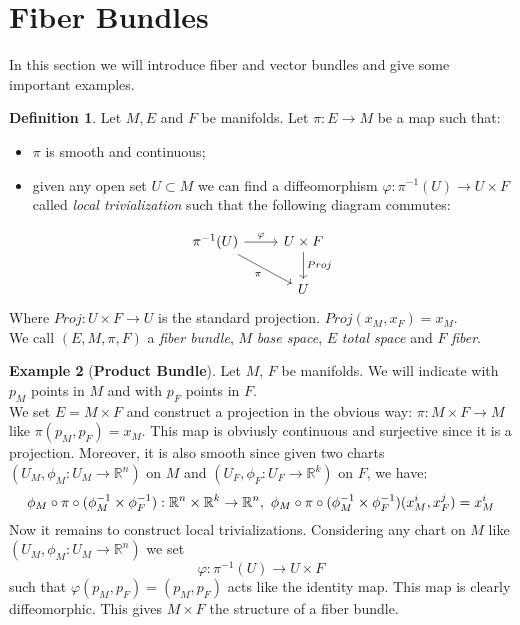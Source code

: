 \documentclass[12pt,a4paper]{report}
\theoremstyle{definition}
\newtheorem{Def}{Definition}[chapter]
\theoremstyle{Theorem}
\theoremstyle{definition}
\newtheorem{Ex}[Def]{Example}
\theoremstyle{definition}
\begin{document}
		\section{Fiber Bundles}
		In this section we will introduce fiber and vector bundles and give some important examples.
			\begin{Def}
				Let $M, E$ and $F$ be manifolds. Let $\pi: E\rightarrow M$ be a map such that:
				\begin{itemize}
					\item $\pi$ is smooth and continuous;
					\item given any open set $U\subset M$ we can find a diffeomorphism $\varphi: \pi^{-1}(U)\rightarrow U\times F$ called \textit{local trivialization} such that the following diagram commutes:
				\end{itemize}
						\[
				\begin{tikzcd}
					\pi^{-1}(U) \arrow{r}{\varphi} \arrow[swap]{dr}{\pi} & U\times F \arrow{d}{Proj}\\
					& U 
				\end{tikzcd}
				\]
				Where $Proj: U\times F\rightarrow U$ is the standard projection. $Proj(x_M,x_F)=x_M$.\\
				We call $(E,M,\pi,F)$ a \textit{fiber bundle}, $M$ \textit{base space}, $E$ \textit{total space} and $F$ \textit{fiber}.
			\end{Def}
			\begin{Ex}[\textbf{Product Bundle}]\label{Ex_1.1}
				Let $M$, $F$ be manifolds. We will indicate with $p_M$ points in $M$ and with $p_F$ points in $F$.\\ 
				We set $E=M\times F$ and construct a projection in the obvious way: 
				$\pi:M\times F\rightarrow M$ like $\pi(p_M,p_F)=x_M$. This map is obviusly continuous and surjective since it is a projection. Moreover, it is also smooth since given two charts $(U_M,\phi_M:U_M\rightarrow \mathbb{R}^n)$ on $M$ and $(U_F,\phi_F:U_F\rightarrow \mathbb{R}^k)$ on $F$, we have:
				$$\phi_M\circ \pi\circ (\phi_M^{-1}\times \phi_F^{-1}):\mathbb{R}^n\times\mathbb{R}^k\rightarrow\mathbb{R}^n,\hbox{ }\phi_M\circ \pi\circ (\phi_M^{-1}\times \phi_F^{-1})(x^i_M,x^j_F)=x^i_M$$
				Now it remains to construct local trivializations. Considering any chart on $M$ like $(U_M,\phi_M:U_M\rightarrow \mathbb{R}^n)$ we set
				$$\varphi:\pi^{-1}(U)\rightarrow U\times F$$
				such that $\varphi(p_M,p_F)=(p_M,p_F)$ acts like the identity map. This map is clearly diffeomorphic.
				This gives $M\times F$ the structure of a fiber bundle.
			\end{Ex}
\end{document}
